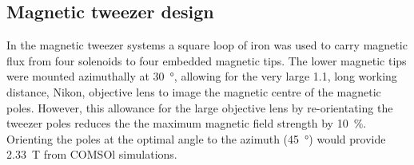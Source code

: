 \subsection{Magnetic tweezer design}

In the magnetic tweezer systems a square loop of iron was used to carry magnetic flux from four solenoids to four embedded magnetic tips.
The lower magnetic tips were mounted azimuthally at \SI{30}{\degree}, allowing for the very large \SI{1.1}{}, long working distance, Nikon, objective lens to image the magnetic centre of the magnetic poles.
However, this allowance for the large objective lens by re-orientating the tweezer poles reduces the the maximum magnetic field strength by \SI{10}{\percent}.
Orienting the poles at the optimal angle to the azimuth (\SI{45}{\degree}) would provide \SI{2.33}{\tesla} from COMSOl simulations.


